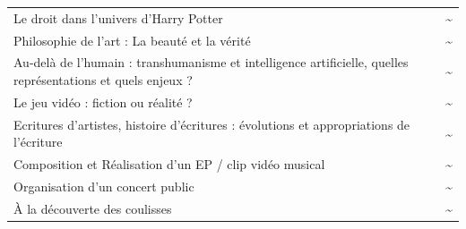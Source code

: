 \documentclass[
  10pt,
  french,
  a5paper,
  openany]{book}
\begin{document}
\begin{longtable}[]{@{}lc@{}}
\begin{minipage}[t]{0.88\columnwidth}\raggedright
Le droit dans l'univers d'Harry Potter\strut
\end{minipage} & \begin{minipage}[t]{0.06\columnwidth}\centering
\textasciitilde{}\strut
\end{minipage}\tabularnewline
\begin{minipage}[t]{0.88\columnwidth}\raggedright
Philosophie de l'art : La beauté et la vérité\strut
\end{minipage} & \begin{minipage}[t]{0.06\columnwidth}\centering
\textasciitilde{}\strut
\end{minipage}\tabularnewline
\begin{minipage}[t]{0.88\columnwidth}\raggedright
Au-delà de l'humain : transhumanisme et intelligence artificielle, quelles représentations et quels enjeux ?\strut
\end{minipage} & \begin{minipage}[t]{0.06\columnwidth}\centering
\textasciitilde{}\strut
\end{minipage}\tabularnewline
\begin{minipage}[t]{0.88\columnwidth}\raggedright
Le jeu vidéo : fiction ou réalité ?\strut
\end{minipage} & \begin{minipage}[t]{0.06\columnwidth}\centering
\textasciitilde{}\strut
\end{minipage}\tabularnewline
\begin{minipage}[t]{0.88\columnwidth}\raggedright
Ecritures d'artistes, histoire d'écritures : évolutions et appropriations de l'écriture\strut
\end{minipage} & \begin{minipage}[t]{0.06\columnwidth}\centering
\textasciitilde{}\strut
\end{minipage}\tabularnewline
\begin{minipage}[t]{0.88\columnwidth}\raggedright
Composition et Réalisation d'un EP / clip vidéo musical\strut
\end{minipage} & \begin{minipage}[t]{0.06\columnwidth}\centering
\textasciitilde{}\strut
\end{minipage}\tabularnewline
\begin{minipage}[t]{0.88\columnwidth}\raggedright
Organisation d'un concert public\strut
\end{minipage} & \begin{minipage}[t]{0.06\columnwidth}\centering
\textasciitilde{}\strut
\end{minipage}\tabularnewline
\begin{minipage}[t]{0.88\columnwidth}\raggedright
À la découverte des coulisses\strut
\end{minipage} & \begin{minipage}[t]{0.06\columnwidth}\centering
\textasciitilde{}\strut
\end{minipage}\tabularnewline
\bottomrule
\end{longtable}
\end{document}
